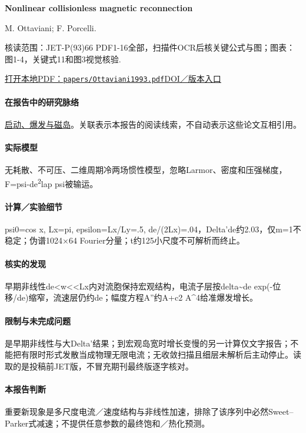 \documentclass[UTF8,a4paper,11pt,openany,fontset=fandol]{ctexbook}
\begin{document}
\textbf{Nonlinear collisionless magnetic reconnection}\citep{Ottaviani1993}\

M. Ottaviani;  F. Porcelli.

\textsf{核读范围：}JET-P(93)66 PDF1-16全部，扫描件OCR后核关键公式与图；\textsf{图表：}图1-4，关键式11和图3视觉核验.

\href{run:../papers/Ottaviani1993.pdf}{打开本地PDF：\texttt{papers/Ottaviani1993.pdf}}\quad\href{https://doi.org/10.1103/PhysRevLett.71.3802}{DOI／版本入口}

\paragraph{在报告中的研究脉络}\hyperref[story:onset]{启动、爆发与磁岛}。关联表示本报告的阅读线索，不自动表示这些论文互相引用。

\paragraph{实际模型}无耗散、不可压、二维周期冷两场惯性模型，忽略Larmor、密度和压强梯度，F=psi-de\textsuperscript{2}lap psi被输运。

\paragraph{计算／实验细节}psi0=cos x, Lx=pi, epsilon=Lx/Ly=.5, de/(2Lx)=.04，Delta'de约2.03，仅m=1不稳定；伪谱1024×64 Fourier分量；t约125小尺度不可解析而终止。

\paragraph{核实的发现}早期非线性de<w<<Lx内对流胞保持宏观结构，电流子层按delta\textasciitilde{}de exp(-位移/de)缩窄，流速层仍约de；幅度方程A''约A+c2 A\textasciicircum{}4给准爆发增长。

\paragraph{限制与未完成问题}是早期非线性与大Delta'结果；到宏观岛宽时增长变慢的另一计算仅文字报告；不能把有限时形式发散当成物理无限电流；无收敛扫描且细层未解析后主动停止。读取的是投稿前JET版，不冒充期刊最终版逐字核对。

\paragraph{本报告判断}重要新现象是多尺度电流／速度结构与非线性加速，排除了该序列中必然Sweet–Parker式减速；不提供任意参数的最终饱和／热化预测。
\end{document}
